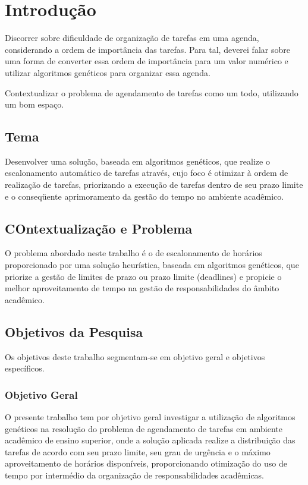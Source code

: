 \chapter[Introdução]{Introdução}

\par Discorrer sobre dificuldade de organização de tarefas em uma agenda, considerando a ordem de importância das tarefas. Para tal, deverei falar sobre uma forma de converter essa ordem de importância para um valor numérico e utilizar algoritmos genéticos para organizar essa agenda.
\par Contextualizar o problema de agendamento de tarefas como um todo, utilizando um bom espaço.



\section[Tema]{Tema}
\par Desenvolver uma solução, baseada em algoritmos genéticos, que realize o escalonamento automático de tarefas através, cujo foco é otimizar à ordem de realização de tarefas, priorizando a execução de tarefas dentro de seu prazo limite e o conseqüente aprimoramento da gestão do tempo no ambiente acadêmico.

\section[Contextualização e Problema]{COntextualização e Problema}
\par O problema abordado neste trabalho é o de escalonamento de horários proporcionado por uma solução heurística, baseada em algoritmos genéticos, que priorize a gestão de limites de prazo ou prazo limite (deadlines) e propicie o melhor aproveitamento de tempo na gestão de responsabilidades do âmbito acadêmico.


\section[Objetivos da Pesquisa]{Objetivos da Pesquisa}
\par Os objetivos deste trabalho segmentam-se em objetivo geral e objetivos específicos.

\subsection[Objetivo Geral]{Objetivo Geral}
\par O presente trabalho tem por objetivo geral investigar a utilização de algoritmos genéticos na resolução do problema de agendamento de tarefas em ambiente acadêmico de ensino superior, onde a solução aplicada realize a distribuição das tarefas de acordo com seu prazo limite, seu grau de urgência e o máximo aproveitamento de horários disponíveis, proporcionando otimização do uso de tempo por intermédio da organização de responsabilidades acadêmicas.

